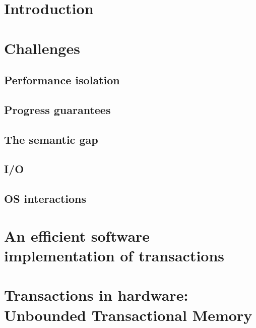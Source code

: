 \documentclass{phd-thesis}
\author{C. Scott Ananian}
\title{\subtitle}
\date{\subdate \\ $ $Revision: 1.16 $ $}
\newcommand{\note}[1]{}%
\begin{document}

\frontmatter


\mainmatter
\chapter{Introduction}


\chapter{Challenges}
\section{Performance isolation}
\note{Cite WDDD here.}
\section{Progress guarantees}\label{sec:progress}
\section{The semantic gap}\label{sec:semantic}
\section{I/O}
\section{OS interactions}

\chapter[Efficient software impl. of trans.]{An efficient software implementation of transactions}\label{sec:softimpl}


\chapter[Transactions in hardware]{Transactions in hardware: Unbounded Transactional Memory}\label{sec:hardimpl}
\end{document}
